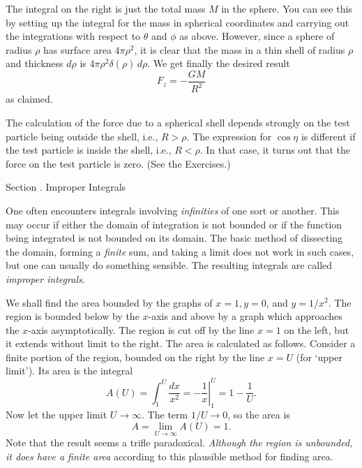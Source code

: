 The integral on the right is
just the total mass $M$ in the sphere.  You can see this by setting
up the integral for the mass in spherical coordinates and carrying
out the integrations with respect to $\theta$ and $\phi$ as above.
However, since a sphere of radius $\rho$ has surface area $4\pi\rho^2$,
it is clear that the mass in a thin shell of radius $\rho$ and
thickness $d\rho$ is $4\pi\rho^2 \delta(\rho)\,d\rho$.
We get finally the desired result
$$
   F_z = -\frac{GM}{R^2}
$$
as claimed.

The calculation of the force due to a spherical shell depends strongly
on the test particle being outside the shell, i.e., $R > \rho$.  The
expression for $\cos\eta$ is different if the test particle is
inside the shell, i.e., $R < \rho$.  In that case, it turns out
that the force on the test particle is zero.   (See the Exercises.)

\bigskip

\bigskip
{}
\head Section \sn.  Improper Integrals \endhead

One often encounters integrals involving {\it infinities\/}
of one sort or another.    This may occur if either the
domain of integration is not bounded or if the function
being integrated is not bounded on its domain.
   The basic method of dissecting the domain, forming
a {\it finite\/} sum, and taking a limit does not work 
in such cases, but one can usually do something sensible.
The resulting integrals are called {\it improper integrals}.
%
%

\nextex
{}  We shall find the area bounded by the graphs of
$x = 1, y = 0$, and $y = 1/x^2$.   The region is bounded  below by
the $x$-axis  and above by a graph which approaches the
$x$-axis asymptotically.  The region is cut off by the line
$x = 1$ on the left, but it extends without limit to the right.
The area is calculated as follows.  Consider a finite portion of
the region, bounded on the right by the line  $x = U$ (for `upper
limit').   Its area is the integral
$$
   A(U) = \int_1^U \frac{dx}{x^2} = \left. -\frac 1x\right|_1^U
             = 1 - \frac 1U.
$$
Now let the upper limit  $U \to \infty$.   The term $1/U \to 0$,
so the area is
$$
   A = \lim_{U\to \infty} A(U) = 1.
$$
Note that the result seems a trifle paradoxical.  {\it Although
the region is unbounded, it does have a finite area\/} according
to this plausible method for finding area.
\endexample

